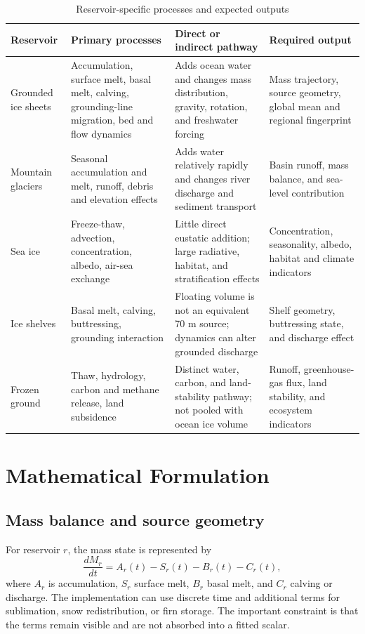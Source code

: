 \documentclass[conference]{IEEEtran}
\begin{document}
\begin{table}[t]
\caption{Reservoir-specific processes and expected outputs}
\label{tab:reservoirs}
\centering
\footnotesize
\setlength{\tabcolsep}{3pt}
\begin{tabular}{p{}p{}p{}p{}}
\toprule
Reservoir & Primary processes & Direct or indirect pathway & Required output\\
\midrule
Grounded ice sheets & Accumulation, surface melt, basal melt, calving, grounding-line migration, bed and flow dynamics & Adds ocean water and changes mass distribution, gravity, rotation, and freshwater forcing & Mass trajectory, source geometry, global mean and regional fingerprint\\
Mountain glaciers & Seasonal accumulation and melt, runoff, debris and elevation effects & Adds water relatively rapidly and changes river discharge and sediment transport & Basin runoff, mass balance, and sea-level contribution\\
Sea ice & Freeze-thaw, advection, concentration, albedo, air-sea exchange & Little direct eustatic addition; large radiative, habitat, and stratification effects & Concentration, seasonality, albedo, habitat and climate indicators\\
Ice shelves & Basal melt, calving, buttressing, grounding interaction & Floating volume is not an equivalent 70 m source; dynamics can alter grounded discharge & Shelf geometry, buttressing state, and discharge effect\\
Frozen ground & Thaw, hydrology, carbon and methane release, land subsidence & Distinct water, carbon, and land-stability pathway; not pooled with ocean ice volume & Runoff, greenhouse-gas flux, land stability, and ecosystem indicators\\
\bottomrule
\end{tabular}
\end{table}

\section{Mathematical Formulation}

\subsection{Mass balance and source geometry}

For reservoir $r$, the mass state is represented by
\begin{equation}
 \frac{dM_r}{dt}=A_r(t)-S_r(t)-B_r(t)-C_r(t),
 \label{eq:mass}
\end{equation}
where $A_r$ is accumulation, $S_r$ surface melt, $B_r$ basal melt, and $C_r$ calving or discharge. The implementation can use discrete time and additional terms for sublimation, snow redistribution, or firn storage. The important constraint is that the terms remain visible and are not absorbed into a fitted scalar.
\end{document}
